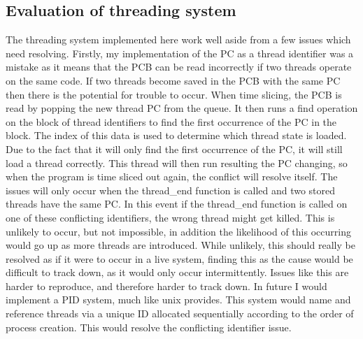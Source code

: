 \subsection{Evaluation of threading system}
\label{threadingeval}
The threading system implemented here work well aside from a few issues which need resolving. Firstly, my implementation of the PC as a thread identifier was a mistake as it means that the PCB can be read incorrectly if two threads operate on the same code. If two threads become saved in the PCB with the same PC then there is the potential for trouble to occur. When time slicing, the PCB is read by popping the new thread PC from the queue. It then runs a find operation on the block of thread identifiers to find the first occurrence of the PC in the block. The index of this data is used to determine which thread state is loaded. Due to the fact that it will only find the first occurrence of the PC, it will still load a thread correctly. This thread will then run resulting the PC changing, so when the program is time sliced out again, the conflict will resolve itself. The issues will only occur when the thread\_end function is called and two stored threads have the same PC. In this event if the thread\_end function is called on one of these conflicting identifiers, the wrong thread might get killed. This is unlikely to occur, but not impossible, in addition the likelihood of this occurring would go up as more threads are introduced. While unlikely, this should really be resolved as if it were to occur in a live system, finding this as the cause would be difficult to track down, as it would only occur intermittently. Issues like this are harder to reproduce, and therefore harder to track down. In future I would implement a PID system, much like unix provides. This system would name and reference threads via a unique ID allocated sequentially according to the order of process creation. This would resolve the conflicting identifier issue.
















